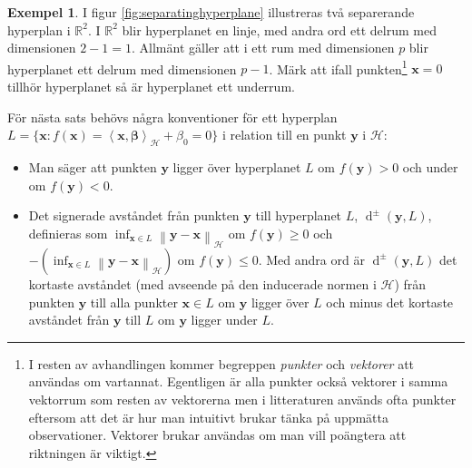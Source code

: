 \documentclass[a4paper, 12pt]{report}
\theoremstyle{definition}
\newtheorem{ex}{Exempel}[section]
\theoremstyle{remark}
\newcommand{\bfbeta}{{\boldsymbol{\beta}}}
\newcommand{\bfx}{\mathbf{x}}
\newcommand{\bfy}{\mathbf{y}}
\newcommand{\llangle}{\left\langle}
\newcommand{\rrangle}{\right\rangle}
\newcommand{\sephyp}{\{ \mathbf{x} : f\left(\mathbf{x}\right)=\inner{\bfx}{\bfbeta}_\mathcal{H} + \beta_0=0\}}
\newcommand{\inner}[2]{\llangle #1, #2 \rrangle}
\newcommand{\hil}{\mathcal{H}}
\begin{document}
\begin{ex}
	I figur \ref{fig:separatinghyperplane} illustreras två separerande hyperplan i $\mathbb{R}^2$. I $\mathbb{R}^2$ blir hyperplanet en linje, med andra ord ett delrum med dimensionen $2-1=1$.
	Allmänt gäller att i ett rum med dimensionen $p$ blir hyperplanet ett delrum med dimensionen $p-1$.
	Märk att ifall punkten\footnote{I resten av avhandlingen kommer begreppen \emph{punkter} och \emph{vektorer} att användas om vartannat. Egentligen är alla punkter också vektorer i samma vektorrum som resten av vektorerna men i litteraturen används ofta punkter eftersom att det är hur man intuitivt brukar tänka på uppmätta observationer. Vektorer brukar användas om man vill poängtera att riktningen är viktigt.} $\bfx = 0$ tillhör hyperplanet så är hyperplanet ett underrum.
\end{ex}

För nästa sats behövs några konventioner för ett hyperplan $L=\sephyp$ i relation till en punkt
$\bfy$ i $\hil$:
\begin{itemize}
	\item Man säger att punkten $\bfy$ ligger över hyperplanet $L$ om $f\left(\bfy\right)>0$ och under om $f\left(\bfy\right)<0$.
	\item Det signerade avståndet från punkten $\bfy$ till hyperplanet $L$, $\operatorname{d}^\pm\!\left(\bfy, L\right)$, definieras som $\inf_{\bfx\in L} \left\|\bfy-\bfx\right\|_\hil$ om $f\left(\bfy\right)\geq0$ och $-\left(\inf_{\bfx\in L} \left\|\bfy-\bfx\right\|_\hil\right)$ om $f\left(\bfy\right)\leq0$.
	Med andra ord är $\operatorname{d}^\pm\left(\bfy,L\right)$ det kortaste avståndet (med avseende på den inducerade normen i $\hil$) från punkten $\bfy$ till alla punkter $\bfx\in L$ om $\bfy$ ligger över $L$ och minus det kortaste avståndet från $\bfy$ till $L$ om $\bfy$ ligger under $L$.
\end{itemize}
\end{document}
